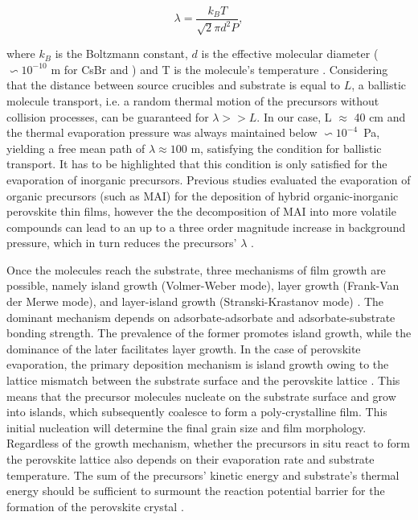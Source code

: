 \begin{equation}
    \lambda = \frac{k_BT}{\sqrt{2}\pi d^2P},
\end{equation}

 where $k_B$ is the Boltzmann constant, $d$ is the effective molecular diameter ($\backsim 10^{-10}$ m for CsBr and ) and T is the molecule's temperature \cite{Dong2023GrowthFilm}. Considering that the distance between source crucibles and substrate is equal to $L$, a ballistic molecule transport, i.e.  a random thermal motion of the precursors without collision processes, can be guaranteed for $\lambda >> L$. In our case, L $\approx$ 40 cm and the thermal evaporation pressure was always maintained below $\backsim 10^{-4}$~Pa, yielding a free mean path of $\lambda \approx 100$ m, satisfying the condition for ballistic transport. It has to be highlighted that this condition is only satisfied for the evaporation of inorganic precursors. Previous studies evaluated the evaporation of organic precursors (such as MAI) for the deposition of hybrid organic-inorganic perovskite thin films, however the the decomposition of MAI into more volatile compounds can lead to an up to a three order magnitude increase in background pressure, which in turn reduces the precursors' $\lambda$ \cite{Abzieher2021FromCells}.
 
 Once the molecules reach the substrate, three mechanisms of film growth are possible, namely island growth (Volmer-Weber mode), layer growth (Frank-Van der Merwe mode), and layer-island growth (Stranski-Krastanov mode) \cite{Wang2024ThermallyBeyond}. The dominant mechanism depends on adsorbate-adsorbate and adsorbate-substrate bonding strength. The prevalence of the former promotes island growth, while the dominance of the later facilitates layer growth. In the case of perovskite evaporation, the primary deposition mechanism is island growth owing to the lattice mismatch between the substrate surface and the perovskite lattice \cite{Chen2018AEfficiency}. This means that the precursor molecules nucleate on the substrate surface and grow into islands, which subsequently coalesce to form a poly-crystalline film. This initial nucleation will determine the final grain size and film morphology. Regardless of the growth mechanism, whether the precursors in situ react to form the perovskite lattice also depends on their evaporation rate and substrate temperature. The sum of the precursors' kinetic energy and substrate's thermal energy should be sufficient to surmount the reaction potential barrier for the formation of the perovskite crystal \cite{DongGrowthFilm}. 

